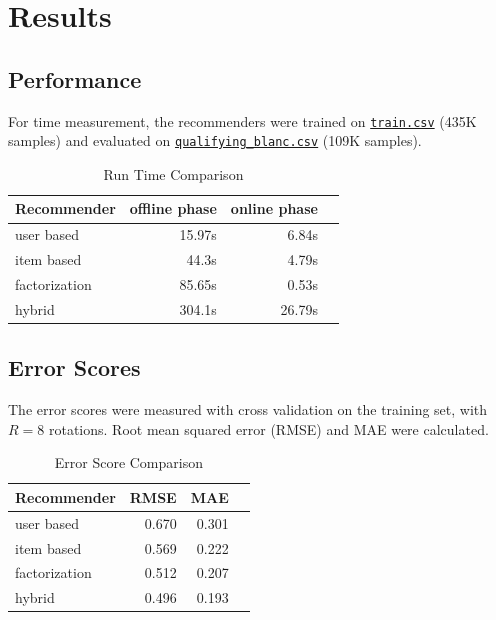\documentclass[sigconf]{acmart}
\begin{document}
\section{Results}
\subsection{Performance}
\label{sec:results:performance}
For time measurement, the recommenders were trained on \href{run:../input/train.csv}{\texttt{train.csv}} (435K samples) and evaluated on \href{run:../input/qualifying_blanc.csv}{\texttt{qualifying\_blanc.csv}} (109K samples).
\begin{table}[htbp]
	\caption{Run Time Comparison}
	\label{tab:results:run_time}
	\begin{tabular}{lrrr}
		\toprule
		Recommender   & offline phase & online phase \\
		\midrule
		user based    & 15.97s        & 6.84s        \\
		item based    & 44.3s         & 4.79s        \\
		factorization & 85.65s        & 0.53s        \\
		hybrid        & 304.1s        & 26.79s       \\
		\bottomrule
	\end{tabular}
\end{table}


\subsection{Error Scores}
\label{sec:results:errors}
The error scores were measured with cross validation on the training set, with $R = 8$ rotations.
Root mean squared error (RMSE) and MAE were calculated.
\begin{table}[htbp]
	\caption{Error Score Comparison}
	\label{tab:results:errors}
	\begin{tabular}{lrrr}
		\toprule
		Recommender   & RMSE  & MAE   \\
		\midrule
		user based    & 0.670 & 0.301 \\
		item based    & 0.569 & 0.222 \\
		factorization & 0.512 & 0.207 \\
		hybrid        & 0.496 & 0.193 \\
		\bottomrule
	\end{tabular}
\end{table}
\FloatBarrier
\end{document}
